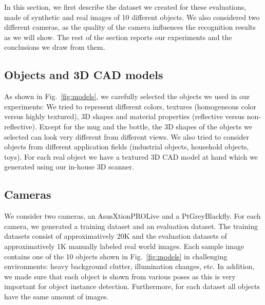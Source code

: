\documentclass[10pt,twocolumn,letterpaper]{article}
\newcommand{\comment}[1]{}
\newcommand{\asus}[0]{AsusXtionPROLive\xspace}
\newcommand{\ptgrey}[0]{PtGreyBlackfly\xspace}
\begin{document}
In this section, we first describe the dataset we created for these evaluations,
made of synthetic  and real images of 10 different  objects.  We also considered
two different cameras,  as the quality of the camera  influences the recognition
results as we  will show.  The rest  of the section reports  our experiments and
the conclusions we draw from them.


\subsection{Objects and 3D CAD models}
\label{lab:objects}

As shown in Fig.~\ref{fig:models}, we carefully  selected the objects we used in
our experiments: We  tried to represent different  colors, textures (homogeneous
color versus  highly textured),  3D shapes  and material  properties (reflective
versus non-reflective).  Except for the mug and the bottle, the 3D shapes of the
objects we selected can look very different from different views.  We also tried
to  consider  objects from  different  application  fields (industrial  objects,
household objects, toys).  For each real object  we have a textured 3D CAD model
at hand which we generated using our in-house 3D scanner.


\subsection{Cameras}
We consider two cameras, an \asus and a \ptgrey.  For each camera, we generated
a training dataset and an evaluation  dataset.  The training datasets consist of
approximatively 20K and  the evaluation datasets of  approximatively 1K manually
labeled real  world images.  Each  sample image contains  one of the  10 objects
shown  in Fig.~\ref{fig:models}  in challenging  environments: heavy  background
clutter, illumination changes, etc.  In addition,  we made sure that each object
is  shown from  various poses  as  this is  very important  for object  instance
detection.  Furthermore,  for each dataset all  objects have the same  amount of
images.    
\comment{We  use   Google's  object   detection  API~\cite{Huang17}   for  our
experiments.}
\end{document}

